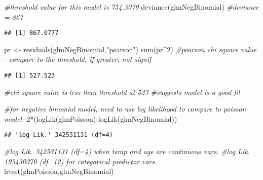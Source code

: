 \documentclass[
]{article}
\newenvironment{Shaded}{\begin{snugshade}}{\end{snugshade}}
\newcommand{\CommentTok}[1]{\textcolor[rgb]{0.56,0.35,0.01}{\textit{#1}}}
\newcommand{\DecValTok}[1]{\textcolor[rgb]{0.00,0.00,0.81}{#1}}
\newcommand{\FunctionTok}[1]{\textcolor[rgb]{0.00,0.00,0.00}{#1}}
\newcommand{\NormalTok}[1]{#1}
\newcommand{\OtherTok}[1]{\textcolor[rgb]{0.56,0.35,0.01}{#1}}
\newcommand{\SpecialCharTok}[1]{\textcolor[rgb]{0.00,0.00,0.00}{#1}}
\newcommand{\StringTok}[1]{\textcolor[rgb]{0.31,0.60,0.02}{#1}}
\begin{document}
\begin{Shaded}
\begin{Highlighting}[]
\CommentTok{\#threshold value for this model is 754.3079}
\FunctionTok{deviance}\NormalTok{(glmNegBinomial) }\CommentTok{\#deviance = 867}
\end{Highlighting}
\end{Shaded}

\begin{verbatim}
## [1] 867.0777
\end{verbatim}

\begin{Shaded}
\begin{Highlighting}[]
\NormalTok{pr }\OtherTok{\textless{}{-}} \FunctionTok{residuals}\NormalTok{(glmNegBinomial,}\StringTok{"pearson"}\NormalTok{)}
\FunctionTok{sum}\NormalTok{(pr}\SpecialCharTok{\^{}}\DecValTok{2}\NormalTok{) }\CommentTok{\#pearson chi square value {-} compare to the threshold, if greater, not signif}
\end{Highlighting}
\end{Shaded}

\begin{verbatim}
## [1] 527.523
\end{verbatim}

\begin{Shaded}
\begin{Highlighting}[]
\CommentTok{\#chi square value is less than threshold at 527}
\CommentTok{\#suggests model is a good fit}

\CommentTok{\#for negative binomial model, need to use log likelihood to compare to poisson model}
\SpecialCharTok{{-}}\DecValTok{2}\SpecialCharTok{*}\NormalTok{(}\FunctionTok{logLik}\NormalTok{(glmPoisson)}\SpecialCharTok{{-}}\FunctionTok{logLik}\NormalTok{(glmNegBinomial))}
\end{Highlighting}
\end{Shaded}

\begin{verbatim}
## 'log Lik.' 342531131 (df=4)
\end{verbatim}

\begin{Shaded}
\begin{Highlighting}[]
\CommentTok{\#\textquotesingle{}log Lik.\textquotesingle{} 342531131 (df=4) when temp and age are continuous vars.}
\CommentTok{\#\textquotesingle{}log Lik.\textquotesingle{} 193430370 (df=12) for categorical predictor vars.}
\FunctionTok{lrtest}\NormalTok{(glmPoisson,glmNegBinomial)}
\end{Highlighting}
\end{Shaded}
\end{document}
